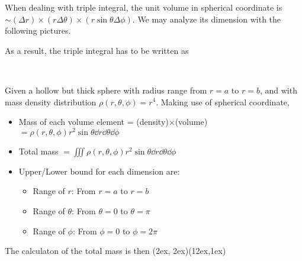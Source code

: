 \documentclass[class=article, crop=false, 12pt]{standalone}
\begin{document}
When dealing with triple integral, 
the unit volume in spherical coordinate is $\sim (\Delta r)\times(r\Delta \theta)\times(r\sin\theta\Delta \phi)$.
We may analyze its dimension with the following pictures.


As a result, the triple integral has to be written as

\\


\begin{example}
    Given a hollow but thick sphere with radius range from $r=a$ to $r=b$,
    and with mass density distribution $\rho(r,\theta,\phi)=r^4$.
    Making use of spherical coordinate,
    \begin{itemize}
        \item Mass of each volume element = (density)$\times$(volume) $= \rho(r,\theta,\phi)r^2\sin\theta\dd{r}\dd{\theta}\dd{\phi}$
        \item Total mass $= \iiint \rho(r,\theta,\phi) r^2\sin\theta\dd{r}\dd{\theta}\dd{\phi}$
        \item Upper/Lower bound for each dimension are:
        \begin{itemize}
            \item Range of $r$: From $r=a$ to $r=b$
            \item Range of $\theta$: From $\theta=0$ to $\theta = \pi$
            \item Range of $\phi$: From $\phi=0$ to $\phi=2\pi$
        \end{itemize}
    \end{itemize}


    The calculaton of the total mass is then
    {(2ex, 2ex)}{(12ex,1ex)}

\end{example}
\theend
\end{document}
